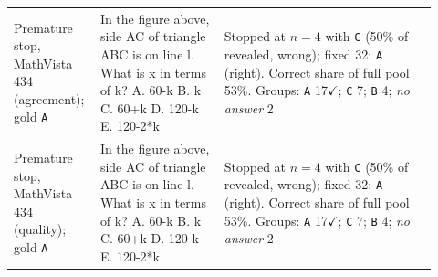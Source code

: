 \begin{tabular}{@{}>{\raggedright\arraybackslash}p{0.16\linewidth}>{\raggedright\arraybackslash}p{0.28\linewidth}>{\raggedright\arraybackslash}p{0.48\linewidth}@{}}
Premature stop, MathVista 434 (agreement); gold \texttt{A} & In the figure above, side AC of triangle ABC is on line l. What is x in terms of k? A. 60-k B. k C. 60+k D. 120-k E. 120-2*k & Stopped at $n=4$ with \texttt{C} (50\% of revealed, wrong); fixed 32: \texttt{A} (right). Correct share of full pool 53\%. Groups: \texttt{A} 17$\checkmark$; \texttt{C} 7; \texttt{B} 4; \textit{no answer} 2 \\
Premature stop, MathVista 434 (quality); gold \texttt{A} & In the figure above, side AC of triangle ABC is on line l. What is x in terms of k? A. 60-k B. k C. 60+k D. 120-k E. 120-2*k & Stopped at $n=4$ with \texttt{C} (50\% of revealed, wrong); fixed 32: \texttt{A} (right). Correct share of full pool 53\%. Groups: \texttt{A} 17$\checkmark$; \texttt{C} 7; \texttt{B} 4; \textit{no answer} 2 \\
\bottomrule
\end{tabular}